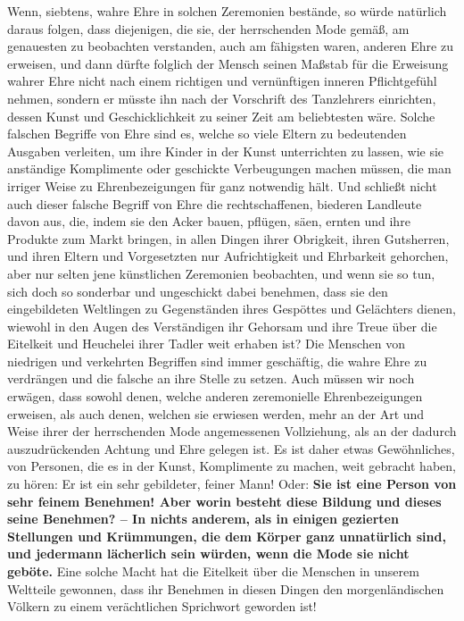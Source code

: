 Wenn, siebtens, wahre Ehre in solchen Zeremonien bestände, so würde natürlich
daraus folgen, dass diejenigen, die sie, der herrschenden Mode gemäß, am
genauesten zu beobachten verstanden, auch am fähigsten waren, anderen Ehre zu
erweisen, und dann dürfte folglich der Mensch seinen Maßstab für die Erweisung
wahrer Ehre nicht nach einem richtigen und vernünftigen inneren Pflichtgefühl
nehmen, sondern er müsste ihn nach der Vorschrift des Tanzlehrers einrichten,
dessen Kunst und Geschicklichkeit zu seiner Zeit am beliebtesten wäre. Solche
falschen Begriffe von Ehre sind es, welche so viele
Eltern
zu bedeutenden
Ausgaben verleiten, um ihre Kinder in der Kunst unterrichten zu lassen, wie sie
anständige Komplimente oder geschickte Verbeugungen machen müssen, die man
irriger Weise zu Ehrenbezeigungen für ganz notwendig hält.
 Und schließt nicht
auch dieser falsche Begriff von Ehre die rechtschaffenen, biederen Landleute
davon aus, die, indem sie den Acker bauen, pflügen, säen, ernten und ihre
Produkte zum Markt bringen, in allen Dingen ihrer Obrigkeit, ihren Gutsherren,
und ihren Eltern und Vorgesetzten nur Aufrichtigkeit und Ehrbarkeit gehorchen,
aber nur selten jene künstlichen Zeremonien beobachten, und wenn sie so tun,
sich doch so sonderbar und ungeschickt dabei benehmen, dass sie den
eingebildeten Weltlingen zu Gegenständen ihres Gespöttes und Gelächters dienen,
wiewohl in den Augen des Verständigen ihr Gehorsam und ihre Treue über die
Eitelkeit und Heuchelei ihrer Tadler weit erhaben ist? Die Menschen von
niedrigen und verkehrten Begriffen sind immer geschäftig, die wahre Ehre zu
verdrängen und die falsche an ihre Stelle zu setzen. Auch müssen wir noch
erwägen, dass sowohl denen, welche anderen zeremonielle Ehrenbezeigungen
erweisen,
als auch denen, welchen sie erwiesen werden, mehr an der Art und Weise ihrer der
herrschenden Mode angemessenen Vollziehung, als an der dadurch auszudrückenden
Achtung und Ehre gelegen ist. Es ist daher etwas Gewöhnliches, von Personen, die
es in der Kunst, Komplimente zu machen, weit gebracht haben, zu hören: Er ist
ein sehr gebildeter, feiner Mann!
Oder: \label{ref:09_26_feines_benemen} \textbf{Sie ist
eine Person von sehr feinem
Benehmen! Aber worin besteht diese Bildung und dieses seine Benehmen? -- In
nichts anderem, als in einigen gezierten Stellungen und Krümmungen, die dem
Körper ganz unnatürlich sind, und jedermann lächerlich sein würden, wenn die
Mode
sie nicht geböte.} Eine solche Macht hat die Eitelkeit über die Menschen in
unserem Weltteile gewonnen, dass ihr Benehmen in diesen Dingen den
morgenländischen Völkern zu einem verächtlichen Sprichwort geworden ist!

